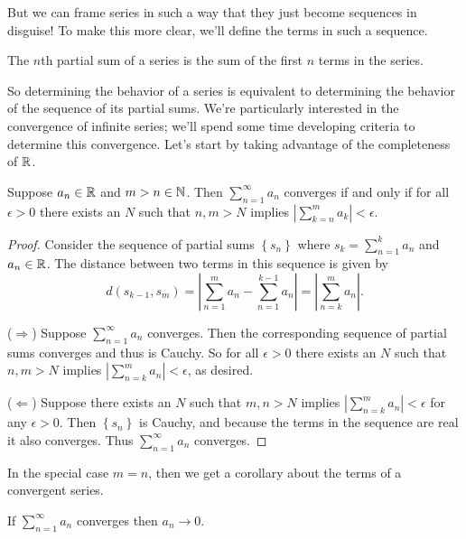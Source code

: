 \documentclass[../m131main.tex]{subfiles}
\begin{document}
But we can frame series in such a way that they just become sequences in disguise!
To make this more clear, we'll define the terms in such a sequence.

\begin{definition}
    The $n$th partial sum of a series is the sum of the first $n$ terms in the series.
\end{definition}

So determining the behavior of a series is equivalent to determining the behavior of the sequence of its partial sums.
We're particularly interested in the convergence of infinite series; we'll spend some time developing criteria to determine this convergence.
Let's start by taking advantage of the completeness of $\mathbb{R}$.

\pagebreak

\begin{theorem}
    Suppose $a_n \in \mathbb{R}$ and $m > n \in \mathbb{N}$.
    Then $\sum_{n=1}^{\infty} a_n$ converges if and only if for all $\epsilon > 0$ there exists an $N$ such that $n,m > N$ implies $\left| \sum_{k=n}^{m} a_k \right| < \epsilon$.
\end{theorem}

\begin{proof}
    Consider the sequence of partial sums $\left\{ s_n \right\}$ where $s_k = \sum_{n=1}^{k} a_n$ and $a_n \in \mathbb{R}$.
    The distance between two terms in this sequence is given by
    \[ d(s_{k-1}, s_m) = \left| \sum_{n=1}^{m} a_n - \sum_{n=1}^{k-1} a_n \right| = \left| \sum_{n=k}^{m} a_n \right|. \]

    ($\Rightarrow$) Suppose $\sum_{n=1}^{\infty} a_n$ converges.
    Then the corresponding sequence of partial sums converges and thus is Cauchy.
    So for all $\epsilon > 0$ there exists an $N$ such that $n,m > N$ implies $\left| \sum_{n=k}^{m} a_n \right| < \epsilon$, as desired.

    ($\Leftarrow$) Suppose there exists an $N$ such that $m,n > N$ implies $\left| \sum_{n=k}^{m} a_n \right| < \epsilon$ for any $\epsilon > 0$.
    Then $\left\{ s_n \right\}$ is Cauchy, and because the terms in the sequence are real it also converges.
    Thus $\sum_{n=1}^{\infty} a_n$ converges.
\end{proof} %

In the special case $m=n$, then we get a corollary about the terms of a convergent series.

\begin{corollary}
    If $\sum_{n=1}^{\infty} a_n$ converges then $a_n \to 0$.
\end{corollary}
\end{document}
